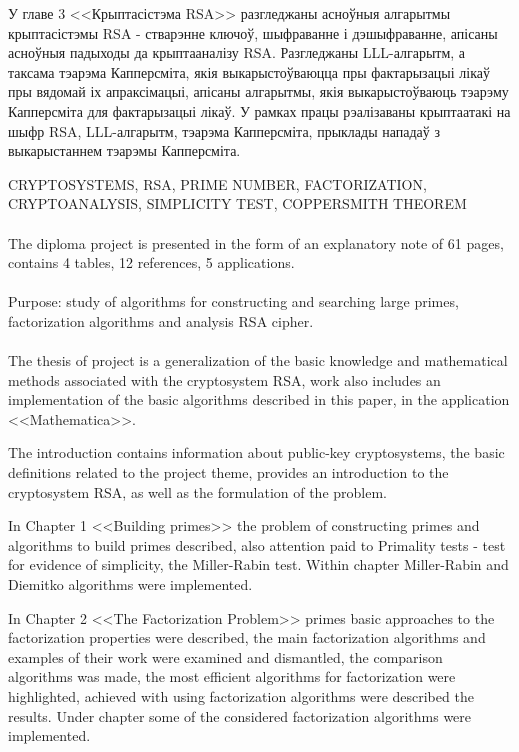 У главе 3 <<Крыптасістэма RSA>> разгледжаны асноўныя алгарытмы крыптасістэмы RSA - стварэнне ключоў, шыфраванне і дэшыфраванне, апісаны асноўныя
падыходы да крыптааналізу RSA. Разгледжаны LLL-алгарытм, а таксама тэарэма Капперсміта, якія выкарыстоўваюцца пры фактарызацыі лікаў пры вядомай іх
апраксімацыі, апісаны алгарытмы, якія выкарыстоўваюць тэарэму Капперсміта для фактарызацыі лікаў. У рамках працы рэалізаваны крыптаатакі на шыфр RSA, LLL-алгарытм, тэарэма Капперсміта, прыклады нападаў з выкарыстаннем тэарэмы Капперсміта.

\newpage

CRYPTOSYSTEMS, RSA, PRIME NUMBER, FACTORIZATION, CRYPTO\-ANALYSIS, SIMPLICITY TEST, COPPERSMITH THEOREM

\paragraph{} The diploma project is presented in the form of an explanatory note of 61 pages, contains 4 tables, 12 references, 5 applications.

\paragraph{} Purpose: study of algorithms for constructing and searching large primes, factori\-zation algorithms and analysis RSA cipher.

\paragraph{} The thesis of project is a generalization of the basic knowledge and mathematical methods associated with the cryptosystem RSA, work also includes an implemen\-tation of the basic algorithms described in this paper, in the application <<Mathema\-tica>>.

The introduction contains information about public-key cryptosystems, the basic definitions related to the project theme,
provides an introduction to the cryptosystem RSA, as well as the formulation of the problem.

In Chapter 1 <<Building primes>> the problem of constructing primes and algorithms to build primes described,
also attention paid to Primality tests - test for evidence of simplicity, the Miller-Rabin test. Within
chapter Miller-Rabin and Diemitko algorithms were implemented.

In Chapter 2 <<The Factorization Problem>> primes basic approaches to the factorization properties were described, the main factorization algorithms and examples of their work were examined and dismantled, the comparison algorithms was made, the most efficient algorithms for factorization were highlighted, achieved with using factorization algorithms were described the results. Under chapter some of the considered factorization algorithms were implemented.

